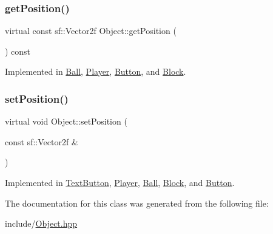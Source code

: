 \mbox{\label{class_object_a3fd6370b8cfc53e5e41d09704726c2d4}} 
\subsubsection{\texorpdfstring{getPosition()}{getPosition()}}
{\footnotesize\ttfamily virtual const sf\+::\+Vector2f Object\+::get\+Position (\begin{DoxyParamCaption}{ }\end{DoxyParamCaption}) const\hspace{0.3cm}{\ttfamily [pure virtual]}}



Implemented in \mbox{\hyperlink{class_ball_a672da3b511f6b30fde82a63927fe8174}{Ball}}, \mbox{\hyperlink{class_player_a6599dac14c1f2ac94e9160c99376333e}{Player}}, \mbox{\hyperlink{class_button_a01ff4aace35c7d0c4d8b35eda290378f}{Button}}, and \mbox{\hyperlink{class_block_ae7621aaed284804fc898174207eb1587}{Block}}.

\mbox{\label{class_object_ac5c796bfa75dedf6d3bfc74685b2b77d}} 
\subsubsection{\texorpdfstring{setPosition()}{setPosition()}}
{\footnotesize\ttfamily virtual void Object\+::set\+Position (\begin{DoxyParamCaption}\item[{const sf\+::\+Vector2f \&}]{ }\end{DoxyParamCaption})\hspace{0.3cm}{\ttfamily [pure virtual]}}



Implemented in \mbox{\hyperlink{class_text_button_a4550c33ce65f77b9e9e119526bfcc357}{Text\+Button}}, \mbox{\hyperlink{class_player_a9f37a6ecb0abbea3eed1348266135879}{Player}}, \mbox{\hyperlink{class_ball_af2260b5f0b9b20d4974ada97481004f3}{Ball}}, \mbox{\hyperlink{class_block_a9c4782f321b4760d572a01bd31c42a06}{Block}}, and \mbox{\hyperlink{class_button_a95a9aafc24ed5d95d3557f7155832433}{Button}}.



The documentation for this class was generated from the following file\+:\begin{DoxyCompactItemize}
\item 
include/\mbox{\hyperlink{_object_8hpp}{Object.\+hpp}}\end{DoxyCompactItemize}
